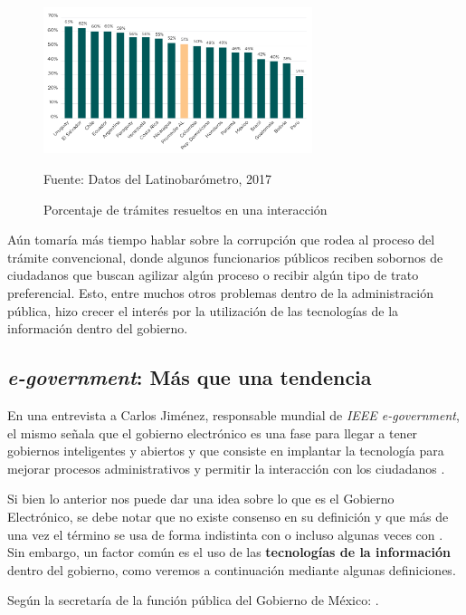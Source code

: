 \begin{figure}
    \centering
    \includegraphics[width=0.7\textwidth]{assets/tramites_una_interaccion}
    \caption{Porcentaje de trámites resueltos en una interacción}{Fuente: Datos del Latinobarómetro, 2017}
    \label{fig:tramites_una_interaccion}
\end{figure}

Aún tomaría más tiempo hablar sobre la corrupción que rodea al proceso del trámite convencional, 
donde algunos funcionarios públicos reciben sobornos de ciudadanos que buscan agilizar algún proceso o recibir algún tipo de trato preferencial.
Esto, entre muchos otros problemas dentro de la administración pública, hizo crecer el interés por la utilización de las tecnologías de la información dentro del gobierno.

\subsection{\textit{e-government}: Más que una tendencia}

En una entrevista a Carlos Jiménez, responsable mundial de \textit{IEEE e-government}, el mismo señala que 
el gobierno electrónico es una fase para llegar a tener gobiernos inteligentes y abiertos y que 
consiste en implantar la tecnología para mejorar procesos administrativos y permitir la interacción con los ciudadanos \cite{digitalGobiernoInteligenteEntrevista2015}.

Si bien lo anterior nos puede dar una idea sobre lo que es el Gobierno Electrónico, se debe notar que no existe consenso en su definición y que más de una vez el término se usa de forma indistinta con  o incluso algunas veces con .
Sin embargo, un factor común es el uso de las \textbf{tecnologías de la información} dentro del gobierno, como veremos a continuación mediante algunas definiciones.

Según la secretaría de la función pública del Gobierno de México: 
 \cite{publicaGobiernoDigitalElectronico}.


